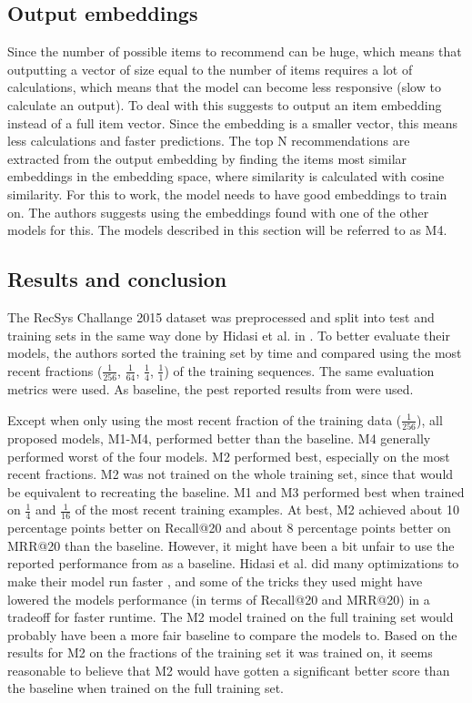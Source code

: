 \subsection{Output embeddings}
Since the number of possible items to recommend can be huge, which means that outputting a vector of size equal to the number of items requires a lot of calculations, which means that the model can become less responsive (slow to calculate an output). To deal with this \cite{DBLP:journals/corr/TanXL16} suggests to output an item embedding instead of a full item vector. Since the embedding is a smaller vector, this means less calculations and faster predictions. The top N recommendations are extracted from the output embedding by finding the items most similar embeddings in the embedding space, where similarity is calculated with cosine similarity. For this to work, the model needs to have good embeddings to train on. The authors suggests using the embeddings found with one of the other models for this. The models described in this section will be referred to as M4.

\subsection{Results and conclusion}
The RecSys Challange 2015 dataset was preprocessed and split into test and training sets in the same way done by Hidasi et al. in \cite{DBLP:journals/corr/HidasiKBT15}. To better evaluate their models, the authors sorted the training set by time and compared using the most recent fractions ($\frac{1}{256}$, $\frac{1}{64}$, $\frac{1}{4}$, $\frac{1}{1}$) of the training sequences. The same evaluation metrics were used. As baseline, the pest reported results from \cite{DBLP:journals/corr/HidasiKBT15} were used.

Except when only using the most recent fraction of the training data ($\frac{1}{256}$), all proposed models, M1-M4, performed better than the baseline. M4 generally performed worst of the four models. M2 performed best, especially on the most recent fractions. M2 was not trained on the whole training set, since that would be equivalent to recreating the baseline. M1 and M3 performed best when trained on $\frac{1}{4}$ and $\frac{1}{16}$ of the most recent training examples. At best, M2 achieved about 10 percentage points better on Recall@20 and about 8 percentage points better on MRR@20 than the baseline. However, it might have been a bit unfair to use the reported performance from \cite{DBLP:journals/corr/HidasiKBT15} as a baseline. Hidasi et al. did many optimizations to make their model run faster \cite{email:Hidasi}, and some of the tricks they used might have lowered the models performance (in terms of Recall@20 and MRR@20) in a tradeoff for faster runtime. The M2 model trained on the full training set would probably have been a more fair baseline to compare the models to. Based on the results for M2 on the fractions of the training set it was trained on, it seems reasonable to believe that M2 would have gotten a significant better score than the baseline when trained on the full training set.


